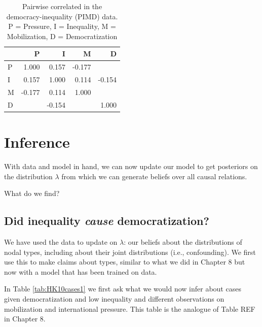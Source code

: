 \documentclass[
  12pt,
]{book}
\begin{document}
\begin{table}

\caption{\label{tab:pimdcorr}Pairwise correlated in the democracy-inequality (PIMD) data. P = Pressure, I = Inequality, M = Mobilization, D = Democratization}
\centering
\begin{tabular}[t]{l|r|r|r|r}
\hline
  & P & I & M & D\\
\hline
P & 1.000 & 0.157 & -0.177 & \\
\hline
I & 0.157 & 1.000 & 0.114 & -0.154\\
\hline
M & -0.177 & 0.114 & 1.000 & \\
\hline
D &  & -0.154 &  & 1.000\\
\hline
\end{tabular}
\end{table}

\hypertarget{inference-1}{%
\section{Inference}\label{inference-1}}

With data and model in hand, we can now update our model to get posteriors on the distribution \(\lambda\) from which we can generate beliefs over all causal relations.

What do we find?

\hypertarget{did-inequality-cause-democratization}{%
\subsection{\texorpdfstring{Did inequality \emph{cause} democratization?}{Did inequality cause democratization?}}\label{did-inequality-cause-democratization}}

We have used the data to update on \(\lambda\): our beliefs about the distributions of nodal types, including about their joint distributions (i.e., confounding). We first use this to make claims about types, similar to what we did in Chapter 8 but now with a model that has been trained on data.

In Table \ref{tab:HK10cases1} we first ask what we would now infer about cases given democratization and low inequality and different observations on mobilization and international pressure. This table is the analogue of Table REF in Chapter 8.
\end{document}
